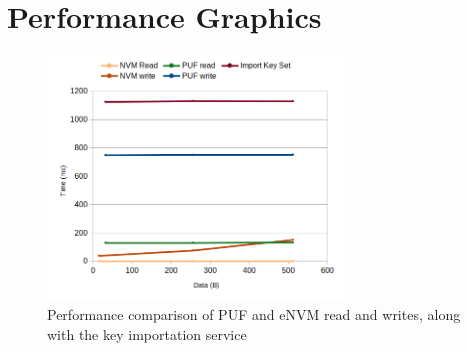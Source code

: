 \chapter{Performance Graphics}
\label{chapter:appendixB}

\begin{figure}[h!]
	\centering
	\includegraphics[width=0.7\textwidth]{./Images/nvm-puf-time.png}
	\caption{Performance comparison of PUF and eNVM read and writes, along with the key importation service}
	\label{fig:performance:nvm-puf-time}
\end{figure}
